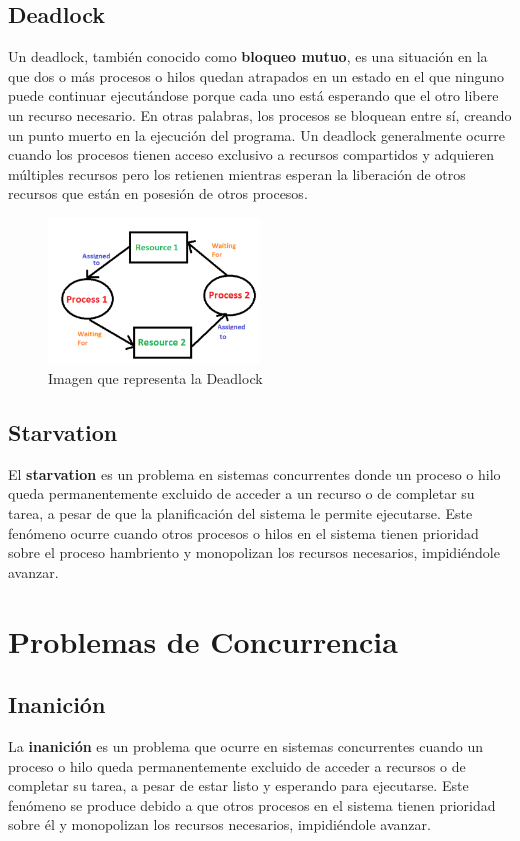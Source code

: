 \documentclass[12pt,a4paper]{article}
\begin{document}
\subsection{Deadlock}
Un deadlock, también conocido como \textbf{bloqueo mutuo}, es una situación en la que dos o más procesos o hilos quedan atrapados en un estado en el que ninguno puede continuar ejecutándose porque cada uno está esperando que el otro libere un recurso necesario. En otras palabras, los procesos se bloquean entre sí, creando un punto muerto en la ejecución del programa.
\espacio
Un deadlock generalmente ocurre cuando los procesos tienen acceso exclusivo a recursos compartidos y adquieren múltiples recursos pero los retienen mientras esperan la liberación de otros recursos que están en posesión de otros procesos.
\begin{figure}[h]
    \centering 
    \caption{Imagen que representa la Deadlock } 
    \includegraphics[width=0.5\textwidth]{images/Deadlock.png}
    
\end{figure}
\subsection{Starvation}
El \textbf{starvation} es un problema en sistemas concurrentes donde un proceso o hilo queda permanentemente excluido de acceder a un recurso o de completar su tarea, a pesar de que la planificación del sistema le permite ejecutarse. Este fenómeno ocurre cuando otros procesos o hilos en el sistema tienen prioridad sobre el proceso hambriento y monopolizan los recursos necesarios, impidiéndole avanzar.

\section{Problemas de Concurrencia}
\subsection{Inanición}
La \textbf{inanición} es un problema que ocurre en sistemas concurrentes cuando un proceso o hilo queda permanentemente excluido de acceder a recursos o de completar su tarea, a pesar de estar listo y esperando para ejecutarse. Este fenómeno se produce debido a que otros procesos en el sistema tienen prioridad sobre él y monopolizan los recursos necesarios, impidiéndole avanzar.
\end{document}
